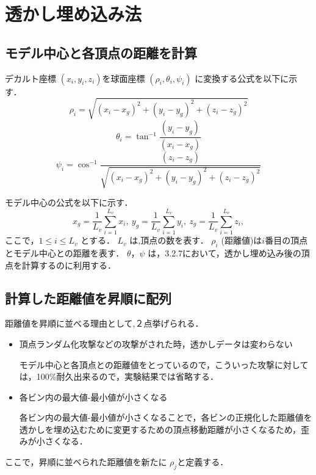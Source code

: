 \documentclass[11pt]{jreport}
\begin{document}
{\section{透かし埋め込み法}
\subsection{モデル中心と各頂点の距離を計算}
デカルト座標
\begin{math}
(x_i,y_i,z_i)
 \end{math}を球面座標
\begin{math}
(\rho_i,\theta_i,\psi_i)
 \end{math}
に変換する公式を以下に示す．
\begin{equation}
 \rho_i=\sqrt{(x_i-x_g)^2+(y_i-y_g)^2+(z_i-z_g)^2}
 \end{equation}
\begin{equation}
\theta_i=\tan^{-1}\frac{(y_i-y_g)}{(x_i-x_g)}
\end{equation}
\begin{equation}
\psi_i=\cos^{-1}\frac{(z_i-z_g)}{\sqrt{(x_i-x_g)^2+(y_i-y_g)^2+(z_i-z_g)^2}}
\end{equation}

モデル中心の公式を以下に示す．
\begin{equation}
x_g=\frac{1}{L_v}\sum_{i=1}^{L_v} x_i,\ y_g=\frac{1}{L_v}\sum_{i=1}^{L_v} y_i,\ z_g=\frac{1}{L_v}\sum_{i=1}^{L_v} z_i,
\end{equation}
ここで，\begin{math}
1 \le i \le L_v
\end{math}
とする．
\begin{math}
L_v
\end{math}
は,頂点の数を表す．
\begin{math}
\rho_i
 \end{math}
(距離値)は\begin{math}i\end{math}番目の頂点とモデル中心との距離を表す．
\begin{math}
\theta，\psi
 \end{math}
は，3.2.7において，透かし埋め込み後の頂点を計算するのに利用する．

\newpage

\subsection{計算した距離値を昇順に配列}
距離値を昇順に並べる理由として,２点挙げられる．
\begin{itemize}
  \item 頂点ランダム化攻撃などの攻撃がされた時，透かしデータは変わらない\par
モデル中心と各頂点との距離値をとっているので，こういった攻撃に対しては，100\%耐久出来るので，実験結果では省略する．
  \item 各ビン内の最大値-最小値が小さくなる\par
各ビン内の最大値-最小値が小さくなることで，各ビンの正規化した距離値を透かしを埋め込むために変更するための頂点移動距離が小さくなるため，歪みが小さくなる．
\end{itemize}
ここで，昇順に並べられた距離値を新たに
\begin{math}
\rho_j
 \end{math}と定義する．
}
\end{document}
